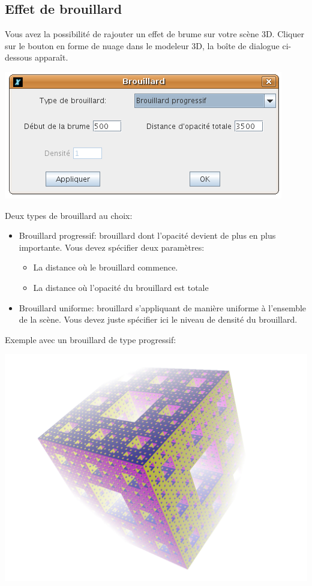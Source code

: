 \subsection*{Effet de brouillard}
Vous avez la possibilité de rajouter un effet de brume sur votre scène 3D. Cliquer sur le bouton en forme de nuage dans le modeleur 3D, la boîte de dialogue ci-dessous apparaît.
\begin{center}
 \includegraphics*[scale=0.6]{images/CaptureFog.png}
\end{center}
Deux types de brouillard au choix:
\begin{itemize}
 \item Brouillard progressif: brouillard dont l'opacité devient de plus en plus importante. Vous devez spécifier deux paramètres:
	\begin{itemize}
 	\item La distance où le brouillard commence.
 	\item La distance où l'opacité du brouillard est totale\\
	\end{itemize}
\item Brouillard uniforme: brouillard s'appliquant de manière uniforme à l'ensemble de la scène. Vous devez juste spécifier ici le niveau de densité du brouillard.
\end{itemize}
\vspace*{0.2cm}
Exemple avec un brouillard de type progressif:
\begin{center}
 \includegraphics*[scale=0.4]{images/example-fog.png}
\end{center}

